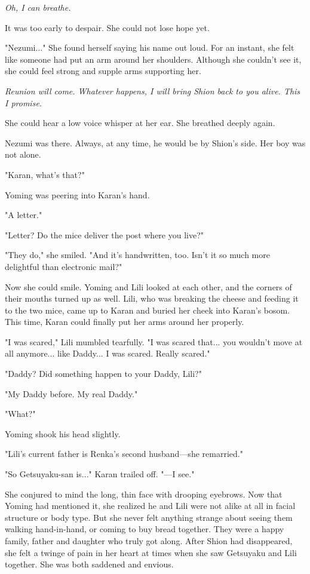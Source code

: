\emph{Oh, I can breathe.}

It was too early to despair. She could not lose hope yet.

"Nezumi..." She found herself saying his name out loud. For an instant,
she felt like someone had put an arm around her shoulders. Although she
couldn't see it, she could feel strong and supple arms supporting her.

\emph{Reunion will come. Whatever happens, I will bring Shion back to you
alive. This I promise.}

She could hear a low voice whisper at her ear. She breathed deeply
again.

Nezumi was there. Always, at any time, he would be by Shion's side. Her
boy was not alone.

"Karan, what's that?"

Yoming was peering into Karan's hand.

"A letter."

"Letter? Do the mice deliver the post where you live?"

"They do," she smiled. "And it's handwritten, too. Isn't it so much more
delightful than electronic mail?"

Now she could smile. Yoming and Lili looked at each other, and the
corners of their mouths turned up as well. Lili, who was breaking the
cheese and feeding it to the two mice, came up to Karan and buried her
cheek into Karan's bosom. This time, Karan could finally put her arms
around her properly.

"I was scared," Lili mumbled tearfully. "I was scared that... you
wouldn't move at all anymore... like Daddy... I was scared. Really
scared."

"Daddy? Did something happen to your Daddy, Lili?"

"My Daddy before. My real Daddy."

"What?"

Yoming shook his head slightly.

"Lili's current father is Renka's second husband---she remarried."

"So Getsuyaku-san is..." Karan trailed off. "---I see."

She conjured to mind the long, thin face with drooping eyebrows. Now
that Yoming had mentioned it, she realized he and Lili were not alike at
all in facial structure or body type. But she never felt anything
strange about seeing them walking hand-in-hand, or coming to buy bread
together. They were a happy family, father and daughter who truly got
along. After Shion had disappeared, she felt a twinge of pain in her
heart at times when she saw Getsuyaku and Lili together. She was both
saddened and envious.

